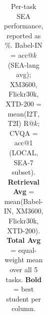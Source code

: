 \documentclass[11pt]{article}
\begin{document}
\begin{table}[h!]
{\begin{tabular}{l c ccc ccc ccc ccc ccc c ccc}
\bottomrule\end{tabular}
}
\caption{Per-task SEA performance, reported as \%.
  Babel-IN = acc@$k$ (SEA-lang avg); XM3600, Flickr30k, XTD-200 = mean(I2T, T2I) R@$k$;
  CVQA = acc@1 (LOCAL, SEA-7 subset).
  \textbf{Retrieval Avg} = mean(Babel-IN, XM3600, Flickr30k, XTD-200).
  \textbf{Total Avg} = equal-weight mean over all 5 tasks.
  \textbf{Bold} = best student per column.}
\label{tab:per_task_rk_mean}
\end{table}
\end{document}
